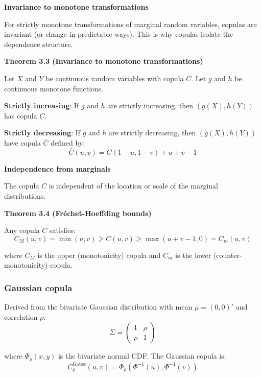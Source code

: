 \documentclass[12pt,a4paper]{article}
\begin{document}
\textbf{Invariance to monotone transformations}

For strictly monotone transformations of marginal random variables, copulas are invariant (or change in predictable ways). This is why copulas isolate the dependence structure.

\vspace{0.5em}

\textbf{Theorem 3.3 (Invariance to monotone transformations)}

Let $X$ and $Y$ be continuous random variables with copula $C$. Let $g$ and $h$ be continuous monotone functions.

\textbf{Strictly increasing}: If $g$ and $h$ are strictly increasing, then $(g(X), h(Y))$ has copula $C$.

\textbf{Strictly decreasing}: If $g$ and $h$ are strictly decreasing, then $(g(X), h(Y))$ have copula $\bar{C}$ defined by:
\[
\bar{C}(u,v) = C(1-u, 1-v) + u + v - 1
\]

\vspace{0.5em}

\textbf{Independence from marginals}

The copula $C$ is independent of the location or scale of the marginal distributions.

\vspace{0.5em}

\textbf{Theorem 3.4 (Fréchet-Hoeffding bounds)}

Any copula $C$ satisfies:
\[
C_M(u,v) = \min(u,v) \geq C(u,v) \geq \max(u+v-1, 0) = C_m(u,v)
\]

where $C_M$ is the upper (monotonicity) copula and $C_m$ is the lower (counter-monotonicity) copula.

\vspace{0.5em}

\subsubsection{Gaussian copula}

Derived from the bivariate Gaussian distribution with mean $\mu = (0,0)'$ and correlation $\rho$:
\[
\Sigma = \begin{pmatrix} 1 & \rho \\ \rho & 1 \end{pmatrix}
\]

where $\Phi_\rho(x,y)$ is the bivariate normal CDF. The Gaussian copula is:
\[
C_\rho^{\text{Gauss}}(u,v) = \Phi_\rho(\Phi^{-1}(u), \Phi^{-1}(v))
\]
\end{document}
